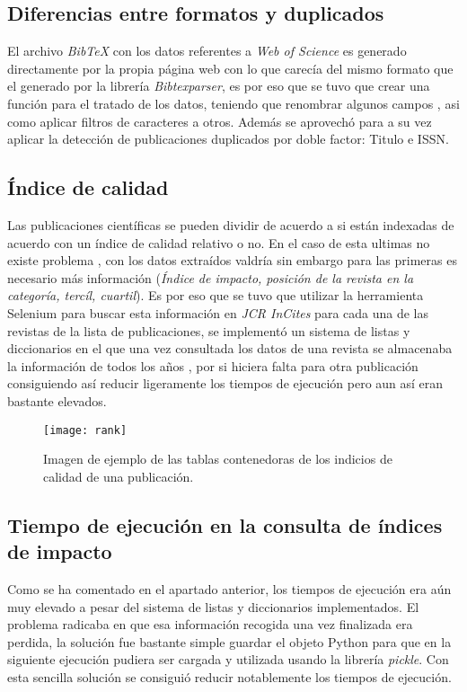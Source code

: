 \subsection{Diferencias entre formatos y duplicados}
El archivo \emph{BibTeX} con los datos referentes a \emph{Web of Science} es generado directamente por la propia página web con lo que carecía del mismo formato que el generado por la librería \emph{Bibtexparser}, es por eso que se tuvo que crear una función para el tratado de los datos, teniendo que renombrar algunos campos , asi como aplicar filtros de caracteres a otros. Además se aprovechó para a su vez aplicar la detección de publicaciones duplicados por doble factor: Titulo e ISSN.
\subsection{Índice de calidad}
Las publicaciones científicas se pueden dividir de acuerdo a si están indexadas de acuerdo con un índice de calidad relativo o no. En el caso de esta ultimas no existe problema , con los datos extraídos valdría sin embargo para las primeras es necesario más información (\emph{Índice de impacto, posición de la revista en la categoría, tercíl, cuartil}). Es por eso que se tuvo que utilizar la herramienta Selenium para buscar esta información en \emph{JCR InCites} para cada una de las revistas de la lista de publicaciones, se implementó un sistema de listas y diccionarios en el que una vez consultada los datos de una revista se almacenaba la información de todos los años , por si hiciera falta para otra publicación consiguiendo así reducir ligeramente los tiempos de ejecución pero aun así eran bastante elevados.
\begin{figure}[H]
	\centering
	\texttt{[image: rank]}
	\caption{Imagen de ejemplo de las tablas contenedoras de los indicios de calidad de una publicación.}
	\label{fig:rank}
\end{figure}
\subsection{Tiempo de ejecución en la consulta de índices de impacto}
Como se ha comentado en el apartado anterior, los tiempos de ejecución era aún muy elevado a pesar del sistema de listas y diccionarios implementados. El problema radicaba en que esa información recogida una vez finalizada era perdida, la solución fue bastante simple guardar el objeto Python para que en la siguiente ejecución pudiera ser cargada y utilizada usando la librería \emph{pickle}.
Con esta sencilla solución se consiguió reducir notablemente los tiempos de ejecución.

